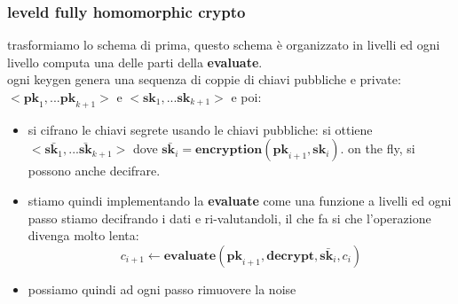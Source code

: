 \documentclass[12pt, oneside]{extbook} %
\begin{document}
\subsubsection{leveld fully homomorphic crypto}
trasformiamo lo schema di prima, questo schema è organizzato in livelli ed ogni livello computa una delle parti della \textbf{evaluate}.\\ogni keygen genera una sequenza di coppie di chiavi pubbliche e private: $< \textbf{pk}_1,...\textbf{pk}_{k+1} >$ e $< \textbf{sk}_1,...\textbf{sk}_{k+1} >$ e poi:
\begin{itemize}
	\item si cifrano le chiavi segrete usando le chiavi pubbliche:
	si ottiene $< \bar{\textbf{sk}_1},...\bar{\textbf{sk}}_{k+1} >$ dove $\bar{\textbf{sk}_i} = \textbf{encryption}(\textbf{pk}_{i+1}, \textbf{sk}_i)$. on the fly, si possono anche decifrare.
	\item stiamo quindi implementando la \textbf{evaluate} come una funzione a livelli ed ogni passo stiamo decifrando i dati e ri-valutandoli, il che fa si che l'operazione divenga molto lenta:\\
	\begin{equation}
		c_{i+1} \leftarrow \textbf{evaluate}(\textbf{pk}_{i+1}, \textbf{decrypt}, \bar{\textbf{sk}_i}, c_i)
	\end{equation}
	\item possiamo quindi ad ogni passo rimuovere la noise
\end{itemize}
\end{document}
